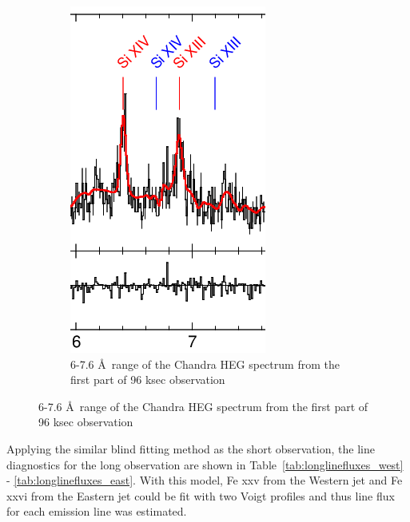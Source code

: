 \begin{figure}[h!]
\begin{subfigure}[t]{.3\textwidth}
        \centering
        \includegraphics[width=\linewidth]{Chapters/Figures/long_pheno_part2.png}
        \caption{6-7.6 \AA\ range of the Chandra HEG spectrum from the first part of 96 ksec observation}
        \label{longportion2}
    \end{subfigure}
    \label{portion}
\end{figure}

\newpage
Applying the similar blind fitting method as the short observation, the line diagnostics for the long observation are shown in Table~\ref{tab:longlinefluxes_west} - \ref{tab:longlinefluxes_east}. With this model, Fe {\sc xxv} from the Western jet and Fe {\sc xxvi} from the Eastern jet could be fit with two Voigt profiles and thus line flux for each emission line was estimated.








